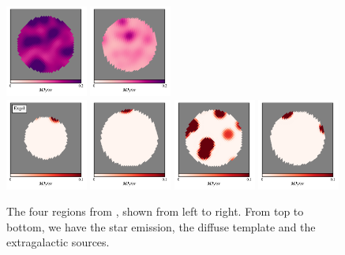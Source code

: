 \documentclass{aa}
\begin{document}
\begin{figure}
    \includegraphics[width=0.24\textwidth]{figs/regions/diffuse_region_2.pdf}
      \includegraphics[width=0.24\textwidth]{figs/regions/diffuse_region_3.pdf}\\
        \includegraphics[width=0.24\textwidth]{figs/regions/exgal_region_0.pdf}
  \includegraphics[width=0.24\textwidth]{figs/regions/exgal_region_1.pdf}
    \includegraphics[width=0.24\textwidth]{figs/regions/exgal_region_2.pdf}
      \includegraphics[width=0.24\textwidth]{figs/regions/exgal_region_3.pdf}\\

  \caption{The four regions from \cite{DIRBE2mass}, shown from left to right. From top to bottom, we have the star emission, the diffuse template and the extragalactic sources. }
  \label{fig:regions}
\end{figure}
\end{document}
